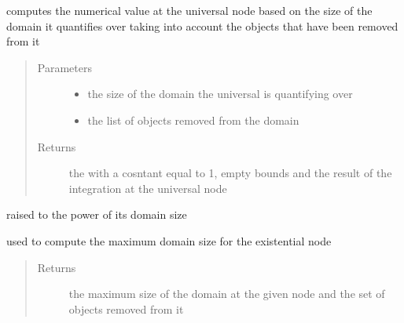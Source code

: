 \documentclass[letterpaper,10pt,english,openany,oneside]{sphinxmanual}
\begin{document}
\begin{fulllineitems}

\begin{fulllineitems}
\label{\detokenize{index:circuit.ForAllNode.compute}}
computes the numerical value at the universal node based on the size of the domain it quantifies over taking into account the 
objects that have been removed from it
\begin{quote}\begin{description}
\item[{Parameters}] \leavevmode\begin{itemize}
\item {} 
 \textendash{} the size of the domain the universal is quantifying over

\item {} 
 \textendash{} the list of objects removed from the domain

\end{itemize}

\item[{Returns}] \leavevmode
the {\hyperref[\detokenize{index:term.Term}]{}} with a cosntant equal to 1, empty bounds and the result of the integration at the universal node

\end{description}\end{quote}

raised to the power of its domain size

\end{fulllineitems}


\begin{fulllineitems}
\label{\detokenize{index:circuit.ForAllNode.maxDomainSize}}
used to compute the maximum domain size for the existential node
\begin{quote}\begin{description}
\item[{Returns}] \leavevmode
the maximum size of the domain at the given node and the set of objects removed from it

\end{description}\end{quote}

\end{fulllineitems}


\end{fulllineitems}
\end{document}
